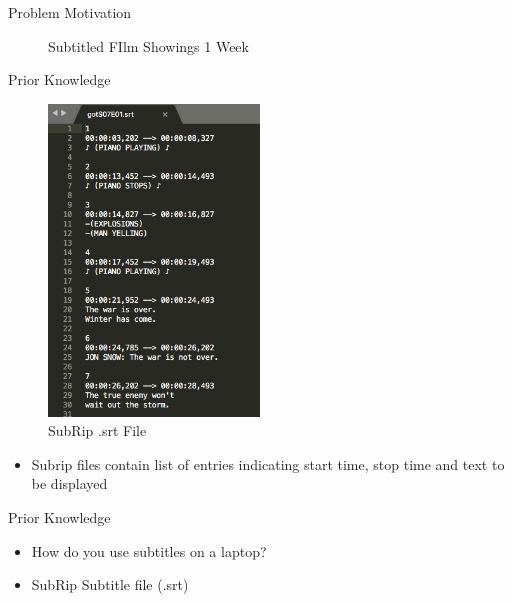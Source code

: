 \documentclass[notes]{beamer}
\begin{document}
\begin{frame}{Problem Motivation}
\begin{figure}
\begin{minipage}{0.45\textwidth}
		\caption{Subtitled FIlm Showings 1 Week}
	\end{minipage}
\end{figure}
\end{frame}



\begin{frame}{Prior Knowledge}
\begin{figure}
	\centering
	\includegraphics[width=0.5\textwidth]{figures/srt}
	\caption{SubRip .srt File}
\end{figure}
\begin{itemize}
	\item Subrip files contain list of entries indicating start time, stop time and text to be displayed
\end{itemize}
\end{frame}


\begin{frame}{Prior Knowledge}
\begin{itemize}
  \item How do you use subtitles on a laptop?
  \item SubRip Subtitle file (.srt)
\end{itemize}
\end{frame}
\end{document}
